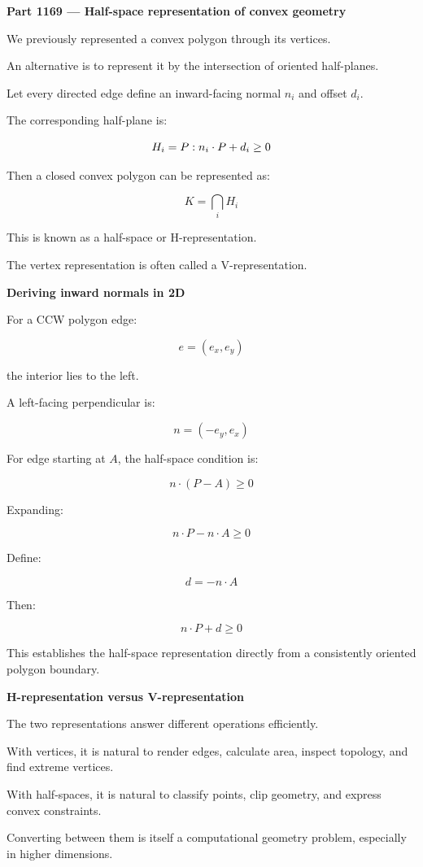 \textbf{Part 1169 --- Half-space representation of convex geometry}

We previously represented a convex polygon through its vertices.

An alternative is to represent it by the intersection of oriented half-planes.

Let every directed edge define an inward-facing normal \(n_i\) and offset \(d_i\).

The corresponding half-plane is:

\[
H_i=\\{P:n_i\cdot P+d_i\ge0\\}
\]

Then a closed convex polygon can be represented as:

\[
\boxed{ K=\bigcap_iH_i }
\]

This is known as a half-space or H-representation.

The vertex representation is often called a V-representation.

\textbf{Deriving inward normals in 2D}

For a CCW polygon edge:

\[
e=(e_x,e_y)
\]

the interior lies to the left.

A left-facing perpendicular is:

\[
\boxed{n=(-e_y,e_x)}
\]

For edge starting at \(A\), the half-space condition is:

\[
n\cdot(P-A)\ge0
\]

Expanding:

\[
n\cdot P-n\cdot A\ge0
\]

Define:

\[
d=-n\cdot A
\]

Then:

\[
n\cdot P+d\ge0
\]

This establishes the half-space representation directly from a consistently oriented polygon boundary.

\textbf{H-representation versus V-representation}

The two representations answer different operations efficiently.

With vertices, it is natural to render edges, calculate area, inspect topology, and find extreme vertices.

With half-spaces, it is natural to classify points, clip geometry, and express convex constraints.

Converting between them is itself a computational geometry problem, especially in higher dimensions.

